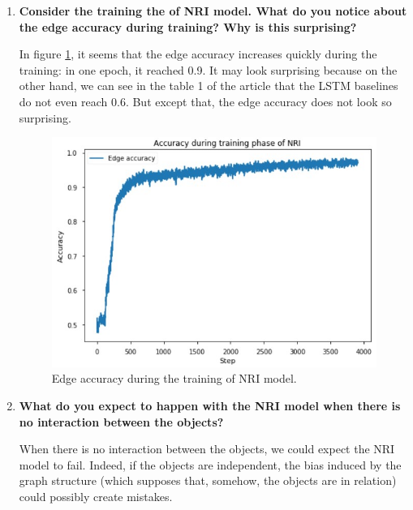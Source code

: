 \documentclass[a4paper, 11pt]{report}
\begin{document}
\begin{enumerate}
	\item \textbf{Consider the training the of NRI model. What do you notice about the edge accuracy during training? Why is this surprising?}
	
	In figure \ref{fig:q6-edge-acc}, it seems that the edge accuracy increases quickly during the training: in one epoch, it reached 0.9. It may look surprising because on the other hand, we can see in the table 1 of the article that the LSTM baselines do not even reach $0.6$. But except that, the edge accuracy does not look so surprising.
	
	\pagebreak
	
	\begin{figure}
	    \centering
	    \includegraphics[scale=.8]{images/q6_edge_acc.jpg}
	    \caption{Edge accuracy during the training of NRI model.}
	    \label{fig:q6-edge-acc}
	\end{figure}
	
	\item \textbf{What do you expect to happen with the NRI model when there is no interaction between the objects?}
	
	When there is no interaction between the objects, we could expect the NRI model to fail. Indeed, if the objects are independent, the bias induced by the graph structure (which supposes that, somehow, the objects are in relation) could possibly create mistakes.
	
\end{enumerate}
\end{document}
